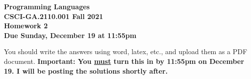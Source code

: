\documentclass[11pt]{article}
\begin{document}



\begin{center}
{\bf
Programming Languages\\

CSCI-GA.2110.001 Fall 2021 \\
\vspace{2ex} 
Homework 2\\
Due Sunday, December 19 at 11:55pm \\
\vspace{2ex}
}
\end{center}

\noindent
You should write the answers using word, latex, etc., and upload them
as a PDF document. {\bf Important: You \underline{must} turn this in
by 11:55pm on December 19.  I will be posting the solutions shortly after.}
\vspace{1ex}
\end{document}

